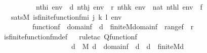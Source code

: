 \begin{isabellebody}
\ \ \ \ \ \ \ \ \ \ {\isachardoublequoteopen}nth{\isacharparenleft}{\kern0pt}i{\isacharcomma}{\kern0pt}\ env{\isacharparenright}{\kern0pt}\ {\isacharequal}{\kern0pt}\ d{\isachardoublequoteclose}\ {\isachardoublequoteopen}nth{\isacharparenleft}{\kern0pt}j{\isacharcomma}{\kern0pt}\ env{\isacharparenright}{\kern0pt}\ {\isacharequal}{\kern0pt}\ r{\isachardoublequoteclose}\ {\isachardoublequoteopen}nth{\isacharparenleft}{\kern0pt}k{\isacharcomma}{\kern0pt}\ env{\isacharparenright}{\kern0pt}\ {\isacharequal}{\kern0pt}\ nat{\isachardoublequoteclose}\ {\isachardoublequoteopen}nth{\isacharparenleft}{\kern0pt}l{\isacharcomma}{\kern0pt}\ env{\isacharparenright}{\kern0pt}\ {\isacharequal}{\kern0pt}\ f{\isachardoublequoteclose}\ \isanewline
\ \ \ {\isachardoublequoteopen}sats{\isacharparenleft}{\kern0pt}M{\isacharcomma}{\kern0pt}\ is{\isacharunderscore}{\kern0pt}finite{\isacharunderscore}{\kern0pt}function{\isacharunderscore}{\kern0pt}fm{\isacharparenleft}{\kern0pt}i{\isacharcomma}{\kern0pt}\ j{\isacharcomma}{\kern0pt}\ k{\isacharcomma}{\kern0pt}\ l{\isacharparenright}{\kern0pt}{\isacharcomma}{\kern0pt}\ env{\isacharparenright}{\kern0pt}\ {\isasymlongleftrightarrow}\ \isanewline
\ \ \ \ \ \ \ \ \ {\isacharparenleft}{\kern0pt}function{\isacharparenleft}{\kern0pt}f{\isacharparenright}{\kern0pt}\ {\isasymand}\ domain{\isacharparenleft}{\kern0pt}f{\isacharparenright}{\kern0pt}\ {\isasymsubseteq}\ d\ {\isasymand}\ finite{\isacharunderscore}{\kern0pt}M{\isacharparenleft}{\kern0pt}domain{\isacharparenleft}{\kern0pt}f{\isacharparenright}{\kern0pt}{\isacharparenright}{\kern0pt}\ {\isasymand}\ range{\isacharparenleft}{\kern0pt}f{\isacharparenright}{\kern0pt}\ {\isasymsubseteq}\ r{\isacharparenright}{\kern0pt}{\isachardoublequoteclose}\ \isanewline
%
\isadelimproof
\ \ %
\endisadelimproof
%
\isatagproof
{}\isamarkupfalse%
\ is{\isacharunderscore}{\kern0pt}finite{\isacharunderscore}{\kern0pt}function{\isacharunderscore}{\kern0pt}fm{\isacharunderscore}{\kern0pt}def\isanewline
\ \ \isamarkupfalse%
{\isacharparenleft}{\kern0pt}rule{\isacharunderscore}{\kern0pt}tac\ Q{\isacharequal}{\kern0pt}{\isachardoublequoteopen}function{\isacharparenleft}{\kern0pt}f{\isacharparenright}{\kern0pt}\ {\isasymand}\ \isanewline
\ \ \ \ \ \ \ \ \ \ \ \ \ \ \ \ \ \ \ \ {\isacharparenleft}{\kern0pt}{\isasymexists}d{\isacharprime}{\kern0pt}\ {\isasymin}\ M{\isachardot}{\kern0pt}\ d{\isacharprime}{\kern0pt}\ {\isacharequal}{\kern0pt}\ domain{\isacharparenleft}{\kern0pt}f{\isacharparenright}{\kern0pt}\ {\isasymand}\ d{\isacharprime}{\kern0pt}\ {\isasymsubseteq}\ d\ {\isasymand}\ finite{\isacharunderscore}{\kern0pt}M{\isacharparenleft}{\kern0pt}d{\isacharprime}{\kern0pt}{\isacharparenright}{\kern0pt}{\isacharparenright}{\kern0pt}\ {\isasymand}\ \isanewline

\end{isabellebody}
